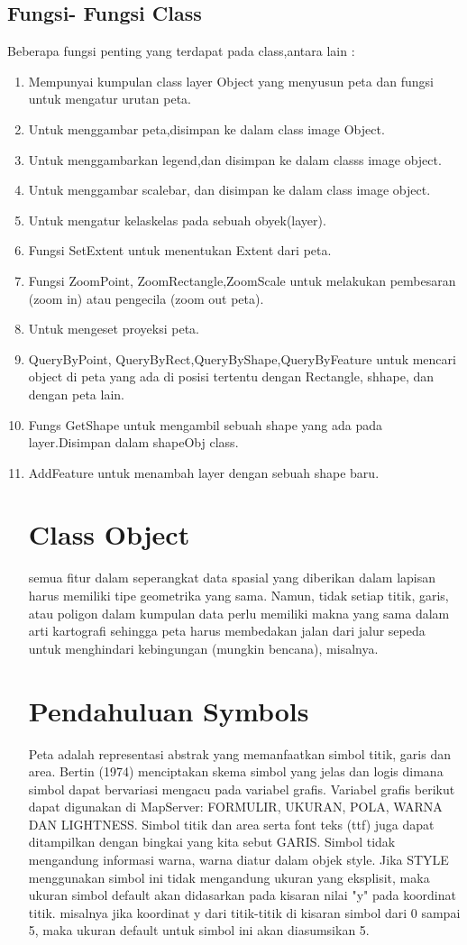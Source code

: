 \subsection {Fungsi- Fungsi Class}
Beberapa fungsi penting yang terdapat pada class,antara lain :
\begin{enumerate}
\item Mempunyai kumpulan class layer Object yang menyusun peta dan fungsi untuk mengatur urutan peta.
\item Untuk menggambar peta,disimpan ke dalam class image Object.
\item Untuk menggambarkan legend,dan disimpan ke dalam classs image object.
\item Untuk menggambar scalebar, dan disimpan ke dalam class image object.
\item Untuk mengatur kelaskelas pada sebuah obyek(layer).
\item Fungsi SetExtent untuk menentukan Extent dari peta.
\item Fungsi ZoomPoint, ZoomRectangle,ZoomScale untuk melakukan pembesaran (zoom in) atau pengecila (zoom out peta).
\item Untuk mengeset proyeksi peta.
\item QueryByPoint, QueryByRect,QueryByShape,QueryByFeature untuk mencari object di peta yang ada di posisi tertentu dengan Rectangle, shhape, dan dengan peta lain.
\item Fungs GetShape untuk mengambil sebuah shape yang ada pada layer.Disimpan dalam shapeObj class.
\item AddFeature untuk menambah layer dengan sebuah shape baru.

\section{Class Object}
    semua fitur dalam seperangkat data spasial yang diberikan dalam lapisan harus memiliki tipe geometrika yang sama. Namun, tidak setiap titik, garis, atau poligon dalam kumpulan data perlu memiliki makna yang sama dalam arti kartografi sehingga peta harus membedakan jalan dari jalur sepeda untuk menghindari kebingungan (mungkin bencana), misalnya.

\section {Pendahuluan Symbols}
    Peta adalah representasi abstrak yang memanfaatkan simbol titik, garis dan area. Bertin (1974) menciptakan skema simbol yang jelas dan logis dimana simbol dapat bervariasi mengacu pada variabel grafis. Variabel grafis berikut dapat digunakan di MapServer: FORMULIR, UKURAN, POLA, WARNA DAN LIGHTNESS. Simbol titik dan area serta font teks (ttf) juga dapat ditampilkan dengan bingkai yang kita sebut GARIS. Simbol tidak mengandung informasi warna, warna diatur dalam objek style. Jika STYLE menggunakan simbol ini tidak mengandung ukuran yang eksplisit, maka ukuran simbol default akan didasarkan pada kisaran nilai "y" pada koordinat titik. misalnya jika koordinat y dari titik-titik di kisaran simbol dari 0 sampai 5, maka ukuran default untuk simbol ini akan diasumsikan 5.
    

\end{enumerate}
